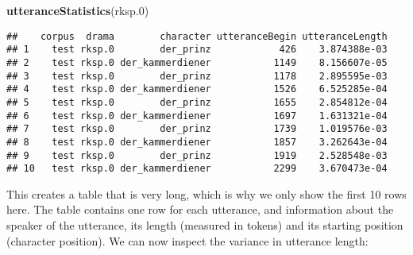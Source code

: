 \documentclass[]{book}
\newenvironment{Shaded}{\begin{snugshade}}{\end{snugshade}}
\newcommand{\CommentTok}[1]{\textcolor[rgb]{0.56,0.35,0.01}{\textit{#1}}}
\newcommand{\DataTypeTok}[1]{\textcolor[rgb]{0.13,0.29,0.53}{#1}}
\newcommand{\DecValTok}[1]{\textcolor[rgb]{0.00,0.00,0.81}{#1}}
\newcommand{\FloatTok}[1]{\textcolor[rgb]{0.00,0.00,0.81}{#1}}
\newcommand{\KeywordTok}[1]{\textcolor[rgb]{0.13,0.29,0.53}{\textbf{#1}}}
\newcommand{\NormalTok}[1]{#1}
\newcommand{\OperatorTok}[1]{\textcolor[rgb]{0.81,0.36,0.00}{\textbf{#1}}}
\newcommand{\StringTok}[1]{\textcolor[rgb]{0.31,0.60,0.02}{#1}}
\begin{document}
\begin{Shaded}
\begin{Highlighting}[]
\KeywordTok{utteranceStatistics}\NormalTok{(rksp}\FloatTok{.0}\NormalTok{)}
\end{Highlighting}
\end{Shaded}

\begin{verbatim}
##    corpus  drama        character utteranceBegin utteranceLength
## 1    test rksp.0        der_prinz            426    3.874388e-03
## 2    test rksp.0 der_kammerdiener           1149    8.156607e-05
## 3    test rksp.0        der_prinz           1178    2.895595e-03
## 4    test rksp.0 der_kammerdiener           1526    6.525285e-04
## 5    test rksp.0        der_prinz           1655    2.854812e-04
## 6    test rksp.0 der_kammerdiener           1697    1.631321e-04
## 7    test rksp.0        der_prinz           1739    1.019576e-03
## 8    test rksp.0 der_kammerdiener           1857    3.262643e-04
## 9    test rksp.0        der_prinz           1919    2.528548e-03
## 10   test rksp.0 der_kammerdiener           2299    3.670473e-04
\end{verbatim}

This creates a table that is very long, which is why we only show the first 10 rows here. The table contains one row for each utterance, and information about the speaker of the utterance, its length (measured in tokens) and its starting position (character position). We can now inspect the variance in utterance length:

\begin{Shaded}
\end{Shaded}
\end{document}
